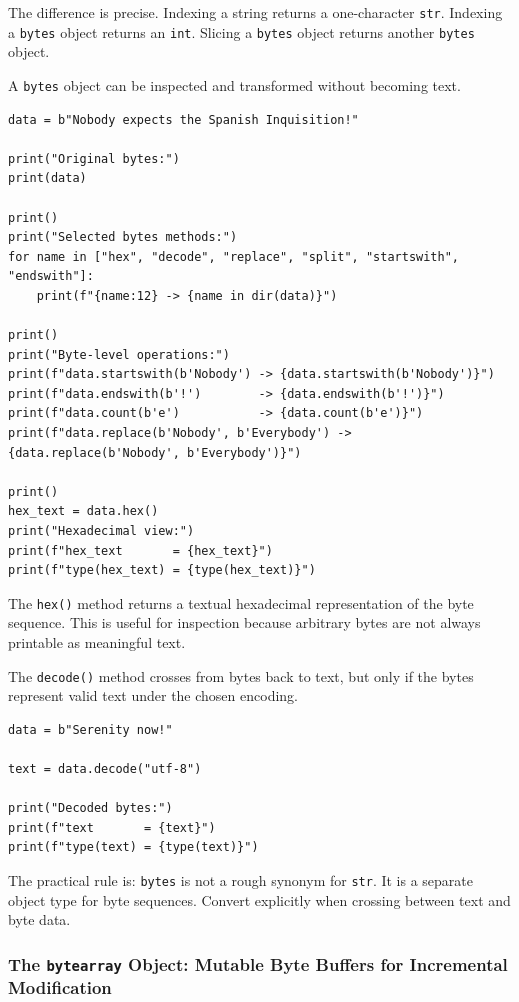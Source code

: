 The difference is precise. Indexing a string returns a one-character \texttt{str}. Indexing a \texttt{bytes} object returns an \texttt{int}. Slicing a \texttt{bytes} object returns another \texttt{bytes} object.

A \texttt{bytes} object can be inspected and transformed without becoming text.

\begin{verbatim}
data = b"Nobody expects the Spanish Inquisition!"

print("Original bytes:")
print(data)

print()
print("Selected bytes methods:")
for name in ["hex", "decode", "replace", "split", "startswith", "endswith"]:
    print(f"{name:12} -> {name in dir(data)}")

print()
print("Byte-level operations:")
print(f"data.startswith(b'Nobody') -> {data.startswith(b'Nobody')}")
print(f"data.endswith(b'!')        -> {data.endswith(b'!')}")
print(f"data.count(b'e')           -> {data.count(b'e')}")
print(f"data.replace(b'Nobody', b'Everybody') -> {data.replace(b'Nobody', b'Everybody')}")

print()
hex_text = data.hex()
print("Hexadecimal view:")
print(f"hex_text       = {hex_text}")
print(f"type(hex_text) = {type(hex_text)}")
\end{verbatim}

The \texttt{hex()} method returns a textual hexadecimal representation of the byte sequence. This is useful for inspection because arbitrary bytes are not always printable as meaningful text.

The \texttt{decode()} method crosses from bytes back to text, but only if the bytes represent valid text under the chosen encoding.

\begin{verbatim}
data = b"Serenity now!"

text = data.decode("utf-8")

print("Decoded bytes:")
print(f"text       = {text}")
print(f"type(text) = {type(text)}")
\end{verbatim}

The practical rule is: \texttt{bytes} is not a rough synonym for \texttt{str}. It is a separate object type for byte sequences. Convert explicitly when crossing between text and byte data.

\subsubsection{The \texttt{bytearray} Object: Mutable Byte Buffers for Incremental Modification}

